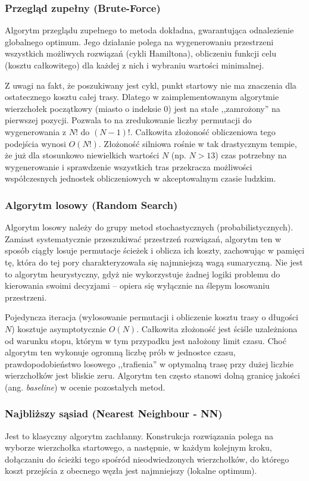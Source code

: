 \documentclass[12pt, a4paper]{article}
\begin{document}
	\subsubsection{Przegląd zupełny (Brute-Force)}
	Algorytm przeglądu zupełnego to metoda dokładna, gwarantująca odnalezienie globalnego optimum. Jego działanie polega na wygenerowaniu przestrzeni wszystkich możliwych rozwiązań (cykli Hamiltona), obliczeniu funkcji celu (kosztu całkowitego) dla każdej z nich i wybraniu wartości minimalnej. 
	
	Z uwagi na fakt, że poszukiwany jest cykl, punkt startowy nie ma znaczenia dla ostatecznego kosztu całej trasy. Dlatego w zaimplementowanym algorytmie wierzchołek początkowy (miasto o indeksie $0$) jest na stałe ,,zamrożony'' na pierwszej pozycji. Pozwala to na zredukowanie liczby permutacji do wygenerowania z $N!$ do $(N-1)!$. 
	Całkowita złożoność obliczeniowa tego podejścia wynosi $O(N!)$. Złożoność silniowa rośnie w tak drastycznym tempie, że już dla stosunkowo niewielkich wartości $N$ (np. $N > 13$) czas potrzebny na wygenerowanie i sprawdzenie wszystkich tras przekracza możliwości współczesnych jednostek obliczeniowych w akceptowalnym czasie ludzkim.
	
	\subsubsection{Algorytm losowy (Random Search)}
	Algorytm losowy należy do grupy metod stochastycznych (probabilistycznych). Zamiast systematycznie przeszukiwać przestrzeń rozwiązań, algorytm ten w sposób ciągły losuje permutacje ścieżek i oblicza ich koszty, zachowując w pamięci tę, która do tej pory charakteryzowała się najmniejszą wagą sumaryczną. Nie jest to algorytm heurystyczny, gdyż nie wykorzystuje żadnej logiki problemu do kierowania swoimi decyzjami – opiera się wyłącznie na ślepym losowaniu przestrzeni.
	
	Pojedyncza iteracja (wylosowanie permutacji i obliczenie kosztu trasy o długości $N$) kosztuje asymptotycznie $O(N)$. Całkowita złożoność jest ściśle uzależniona od warunku stopu, którym w tym przypadku jest nałożony limit czasu. Choć algorytm ten wykonuje ogromną liczbę prób w jednostce czasu, prawdopodobieństwo losowego ,,trafienia'' w optymalną trasę przy dużej liczbie wierzchołków jest bliskie zeru. Algorytm ten często stanowi dolną granicę jakości (ang. \textit{baseline}) w ocenie pozostałych metod.
	
	\subsubsection{Najbliższy sąsiad (Nearest Neighbour - NN)}
	Jest to klasyczny algorytm zachłanny. Konstrukcja rozwiązania polega na wyborze wierzchołka startowego, a następnie, w każdym kolejnym kroku, dołączaniu do ścieżki tego spośród nieodwiedzonych wierzchołków, do którego koszt przejścia z obecnego węzła jest najmniejszy (lokalne optimum). 
	
\end{document}
